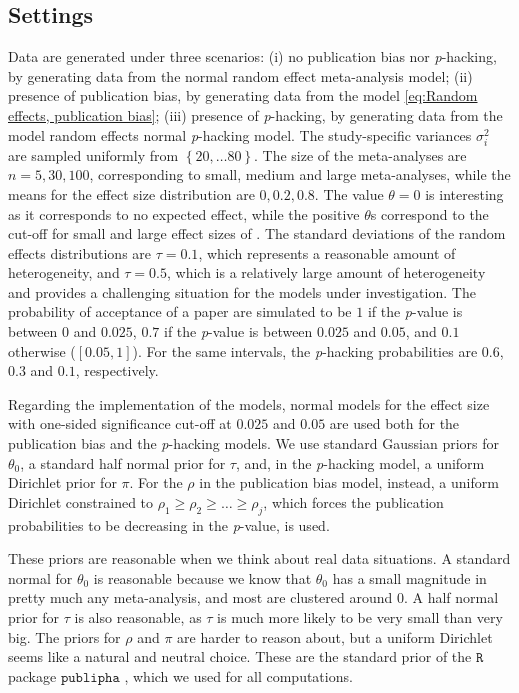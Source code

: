 \documentclass[preprint, authoryear]{elsarticle}
\theoremstyle{plain}
\theoremstyle{definition}
\begin{document}
\subsection{Settings}
Data are generated under three scenarios: (i) no publication bias nor \emph{p}-hacking, by generating data from the normal random effect meta-analysis model; (ii) presence of publication bias, by generating data from the model \eqref{eq:Random effects, publication bias}; (iii) presence of \emph{p}-hacking, by generating data from the model random effects normal \emph{p}-hacking model. The study-specific variances $\sigma_{i}^{2}$ are sampled uniformly from $\left\{ 20,\ldots80\right\} $. The size of the meta-analyses are $n = 5, 30, 100$, corresponding to small, medium and large meta-analyses, while the means for the effect size distribution are $0, 0.2, 0.8$. The value $\theta = 0$ is interesting as it corresponds to no expected effect, while the positive $\theta$s correspond to the cut-off for small and large effect sizes of \citet[][pages 24 -- 27]{cohen1988statistical}. The standard deviations of the random effects distributions are $\tau=0.1$, which represents a reasonable amount of heterogeneity, and $\tau=0.5$, which is a relatively large amount of heterogeneity and provides a challenging situation for the models under investigation. The probability of acceptance of a paper are simulated to be $1$ if the \emph{p}-value is between $0$ and $0.025$, $0.7$ if the \emph{p}-value is between $0.025$ and $0.05$, and $0.1$ otherwise ($[0.05, 1]$). For the same intervals, the \emph{p}-hacking probabilities are $0.6$, $0.3$ and $0.1$, respectively.

Regarding the implementation of the models, normal models for the effect size with one-sided significance cut-off at $0.025$ and $0.05$ are used both for the publication bias and the \emph{p}-hacking models. We use standard Gaussian priors for $\theta_{0}$, a standard half normal prior for $\tau$, and, in the \emph{p}-hacking model, a uniform Dirichlet prior for $\pi$. For the $\rho$ in the publication bias model, instead, a uniform Dirichlet constrained to $\rho_{1}\geq\rho_{2}\geq\ldots\geq\rho_{j}$, which forces the publication probabilities to be decreasing in the \emph{p}-value, is used.

These priors are reasonable when we think about real data situations. A standard normal for $\theta_{0}$ is reasonable because we know that $\theta_{0}$ has a small magnitude in pretty much any meta-analysis, and most are clustered around $0$. A half normal prior for $\tau$ is also reasonable, as $\tau$ is much more likely to be very small than very big. The priors for $\rho$ and $\pi$ are harder to reason about, but a uniform Dirichlet seems like a natural and neutral choice. These are the standard prior of the $\mathtt{R}$ package $\mathtt{publipha}$ \citep{publipha}, which we used for all computations.
\end{document}
